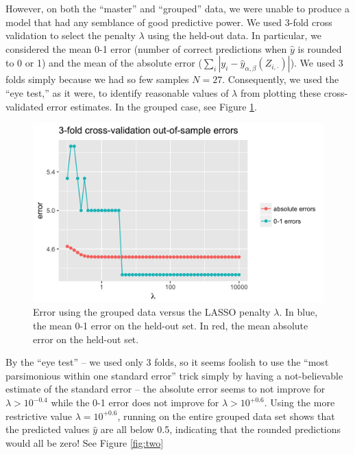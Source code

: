 \documentclass{article}
\begin{document}
However, on both the ``master'' and ``grouped'' data, we were unable to produce a model that had any semblance
of good predictive power. We used 3-fold cross validation to select the penalty $\lambda$ using the held-out data.
In particular, we considered the mean 0-1 error (number of correct predictions when $\hat{y}$ is rounded to 0 or 1)
and the mean of the absolute error ($\sum_i \left|y_i - \hat{y}_{\alpha,\beta}(Z_{i,\cdot})\right|$). We used 3 folds
simply because we had so few samples $N=27$. Consequently, we used the ``eye test,'' as it were, to identify
reasonable values of $\lambda$ from plotting these cross-validated error estimates. In the grouped case, see Figure \ref{fig:one}.

\begin{figure}[h]
\begin{center}
\includegraphics[scale=0.2]{3-fold-CV-kegg.png}
\caption{\label{fig:one}Error using the grouped data versus the LASSO penalty $\lambda$.
In blue, the mean 0-1 error on the held-out set. In red, the mean absolute error on the held-out set.}
\end{center}
\end{figure}

By the ``eye test'' -- we used only 3 folds, so it seems foolish to use the ``most parsimonious within one standard 
error'' trick simply by having a not-believable estimate of the standard error -- the absolute error seems to not 
improve for $\lambda > 10^{-0.4}$ while the 0-1 error does not improve for $\lambda > 10^{+0.6}$. Using the more
restrictive value $\lambda = 10^{+0.6}$, running on the entire grouped data set shows that the predicted values 
$\hat{y}$ are all below 0.5, indicating that the rounded predictions would all be zero! See Figure \ref{fig:two}
\end{document}
